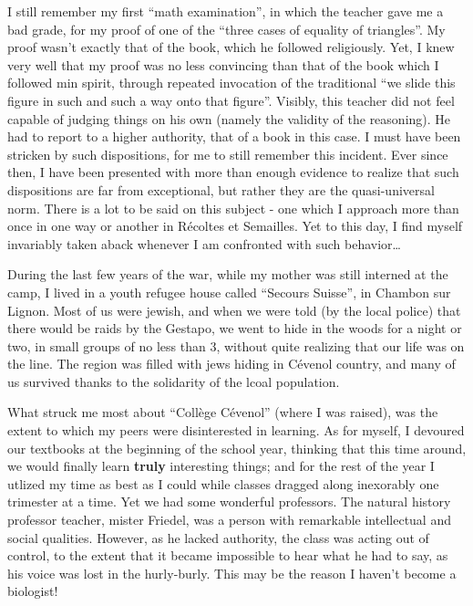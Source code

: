 I still remember my first ``math examination'', in which the teacher gave me a bad grade,
for my proof of one of the ``three cases of equality of triangles''. 
My proof wasn't exactly that of the book, which he followed religiously. 
Yet, I knew very well that my proof was no less convincing than that of the book which I
followed min spirit, through repeated invocation of the traditional
``we slide this figure in such and such a way onto that figure''. 
Visibly, this teacher did not feel capable of judging things on his own (namely the
validity of the reasoning). He had to report to a higher authority, that of a book in this
case. I must have been stricken by such dispositions, for me to still remember this
incident. Ever since then, I have been presented with more than enough evidence to realize
that such dispositions are far from exceptional, but rather they are the quasi-universal
norm. There is a lot to be said on this subject - one which I approach more than once in
one way or another in 
R\'ecoltes et Semailles. Yet to this day, I find myself invariably 
taken aback whenever I am confronted with such behavior\ldots

During the last few years of the war, while my mother was still interned at the camp, I
lived in a youth refugee house called ``Secours Suisse'', in Chambon sur Lignon. Most of
us were jewish, and when we were told (by the local police) that there would be raids by
the Gestapo, we went to hide in the woods for a night or two, in small groups of no less
than 3, without quite realizing that our life was on the line.
The region was filled with jews hiding in C\'evenol country, and many of us survived
thanks to the solidarity of the lcoal population.

What struck me most about
``Coll\`ege C\'evenol'' (where I was raised), was the extent to which my peers were
disinterested in learning. As for myself, I devoured our textbooks at the beginning of the
school year, thinking that this time around, we would finally learn \textbf{truly}
interesting things; and for 
the rest of the year I utlized my time as best as I could while classes dragged along
inexorably one trimester at a time. Yet we had some wonderful professors. The natural
history professor teacher, mister Friedel, was a person with remarkable intellectual and
social qualities. However, as he lacked authority, the class was acting out of control, to
the extent that it became impossible to hear what he had to say, as his voice was lost in
the hurly-burly. This may be the reason I haven't become a biologist! 


